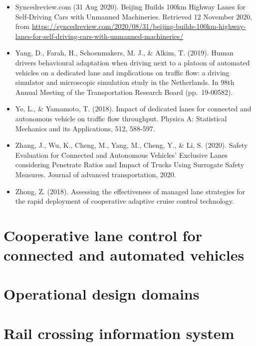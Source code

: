 \documentclass[
]{book}
\begin{document}
\begin{itemize}
\item
  Syncedreview.com (31 Aug 2020). Beijing Builds 100km Highway Lanes for Self-Driving Cars with Unmanned Machineries. Retrieved 12 November 2020, from \url{https://syncedreview.com/2020/08/31/beijing-builds-100km-highway-lanes-for-self-driving-cars-with-unmanned-machineries/}
\item
  Yang, D., Farah, H., Schoenmakers, M. J., \& Alkim, T. (2019). Human drivers behavioural adaptation when driving next to a platoon of automated vehicles on a dedicated lane and implications on traffic flow: a driving simulator and microscopic simulation study in the Netherlands. In 98th Annual Meeting of the Transportation Research Board (pp.~19-00582).
\item
  Ye, L., \& Yamamoto, T. (2018). Impact of dedicated lanes for connected and autonomous vehicle on traffic flow throughput. Physica A: Statistical Mechanics and its Applications, 512, 588-597.
\item
  Zhang, J., Wu, K., Cheng, M., Yang, M., Cheng, Y., \& Li, S. (2020). Safety Evaluation for Connected and Autonomous Vehicles' Exclusive Lanes considering Penetrate Ratios and Impact of Trucks Using Surrogate Safety Measures. Journal of advanced transportation, 2020.
\item
  Zhong, Z. (2018). Assessing the effectiveness of managed lane strategies for the rapid deployment of cooperative adaptive cruise control technology.
\end{itemize}

\hypertarget{cooperative-lane-control-for-connected-and-automated-vehicles}{%
\section{Cooperative lane control for connected and automated vehicles}\label{cooperative-lane-control-for-connected-and-automated-vehicles}}

\hypertarget{operational-design-domains}{%
\section{Operational design domains}\label{operational-design-domains}}

\hypertarget{rail-crossing-information-system}{%
\section{Rail crossing information system}\label{rail-crossing-information-system}}
\end{document}
